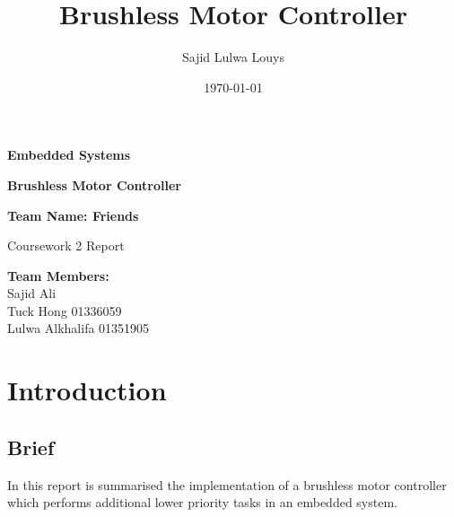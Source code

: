 \documentclass{article}
\title{Brushless Motor Controller}
\author{Sajid Lulwa Louys}
\date{\today}
\begin{document}
\begin{titlepage}
    \begin{center}
        \vspace*{1cm}
            
        \Huge
        \textbf{Embedded Systems}
            
        \vspace{0.5cm}
        \LARGE
        \textbf{Brushless Motor Controller}
            
        \vspace{1.5cm}
            
        \textbf{Team Name: Friends}\\ 
            
        \vfill
            
        Coursework 2 Report\\
       
            
        \vspace{0.8cm}
         
            
        \Large
        \textbf{Team Members:}\\
        Sajid Ali\\
        Tuck Hong 01336059\\
        Lulwa Alkhalifa 01351905 \\
            
    \end{center}
\end{titlepage}


\tableofcontents
\thispagestyle{empty} %
\clearpage

\setcounter{page}{1}

\section{Introduction}
\subsection{Brief}
In this report is summarised the implementation of a brushless motor controller which performs additional lower priority tasks in an embedded system.
\end{document}
